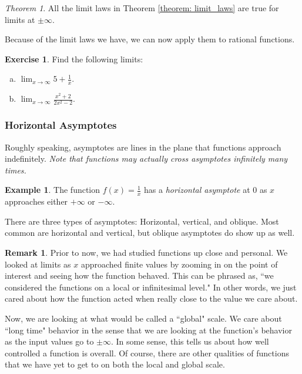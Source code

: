 \documentclass[leqno]{article}
\theoremstyle{definition}
\newtheorem{remark}{Remark}[section]
\newtheorem{example}{Example}[section]
\newtheorem{exercise}{Exercise}[section]
\theoremstyle{remark}
\theoremstyle{theorem}
\newtheorem{theorem}{Theorem}[section]
\begin{document}
\begin{theorem}
All the limit laws in Theorem \ref{theorem: limit_laws} are true for limits at $\pm \infty$. 
\end{theorem}

Because of the limit laws we have, we can now apply them to rational functions.

\begin{exercise}
Find the following limits:
\begin{enumerate}[(a)]
\item $\lim_{x\to \infty} 5+\frac{1}{x}$.
\item $\lim_{x\to \infty} \frac{x^2+2}{2x^2-2}$.
\end{enumerate}
\vspace*{4cm}
\end{exercise}

\subsubsection{Horizontal Asymptotes}

Roughly speaking, asymptotes are lines in the plane that functions approach indefinitely.  \emph{Note that functions may actually cross asymptotes infinitely many times.}  

\begin{example}
The function $f(x)=\frac{1}{x}$ has a \emph{horizontal asymptote} at $0$ as $x$ approaches either $+\infty$ or $-\infty$.
\end{example}

There are three types of asymptotes: Horizontal, vertical, and oblique.  Most common are horizontal and vertical, but oblique asymptotes do show up as well. 

\begin{remark}
Prior to now, we had studied functions up close and personal.  We looked at limits as $x$ approached finite values by zooming in on the point of interest and seeing how the function behaved.  This can be phrased as, ``we considered the functions on a local or infinitesimal level." In other words, we just cared about how the function acted when really close to the value we care about.

Now, we are looking at what would be called a ``global" scale.  We care about ``long time" behavior in the sense that we are looking at the function's behavior as the input values go to $\pm \infty$.  In some sense, this tells us about how well controlled a function is overall.  Of course, there are other qualities of functions that we have yet to get to on both the local and global scale.
\end{remark}
\end{document}
